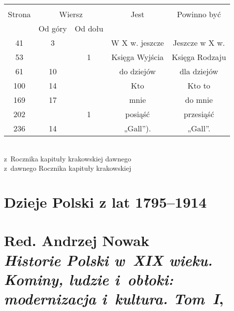 \documentclass[a4paper,11pt]{article}
\numberwithin{equation}{section}
\begin{document}


\begin{center}

  \begin{tabular}{|c|c|c|c|c|}
    \hline
    & \multicolumn{2}{c|}{} & & \\
    Strona & \multicolumn{2}{c|}{Wiersz} & Jest
                              & Powinno być \\ \cline{2-3}
    & Od góry & Od dołu & & \\
    \hline
    41  &  3 & & W X w. jeszcze & Jeszcze w X w. \\
    53  & &  1 & Księga Wyjścia & Księga Rodzaju \\
    61  & 10 & & do dziejów & dla dziejów \\
    100 & 14 & & Kto & Kto to \\
    169 & 17 & & mnie & do mnie \\
    202 & &  1 & posiąść & przesiąść \\
    236 & 14 & & „Gall”). & „Gall”. \\
    \hline
  \end{tabular}

\end{center}

\VerSpaceTwo


\noindent
{} \\
\Jest z~Rocznika kapituły krakowskiej dawnego \\
\PowinnoByc z~dawnego Rocznika kapituły krakowskiej \\












\newpage
\section{Dzieje Polski z lat 1795--1914}

\VerSpaceTwo



\section{ %
  Red. Andrzej Nowak \\
  \textit{Historie Polski w~XIX wieku. Kominy, ludzie
    i~obłoki: modernizacja i~kultura. Tom~I},
  \cite{HistoriaPolskiXIXVolI2013} }
\end{document}
